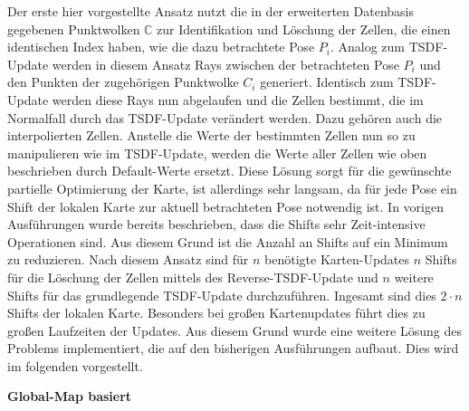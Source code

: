 Der erste hier vorgestellte Ansatz nutzt die in der erweiterten Datenbasis gegebenen Punktwolken $\mathbb{C}$ zur Identifikation und Löschung der Zellen, die einen identischen Index haben, wie die dazu betrachtete Pose $P_i$. Analog zum TSDF-Update werden in diesem Ansatz Rays zwischen der betrachteten Pose $P_i$ und den Punkten der zugehörigen Punktwolke $C_i$ generiert. Identisch zum TSDF-Update werden diese Rays nun abgelaufen und die Zellen bestimmt, die im Normalfall durch das TSDF-Update verändert werden. Dazu gehören auch die interpolierten Zellen. Anstelle die Werte der bestimmten Zellen nun so zu manipulieren wie im TSDF-Update, werden die Werte aller Zellen wie oben beschrieben durch Default-Werte ersetzt. Diese Lösung sorgt für die gewünschte partielle Optimierung der Karte, ist allerdings sehr langsam, da für jede Pose ein Shift der lokalen Karte zur aktuell betrachteten Pose notwendig ist. In vorigen Ausführungen wurde bereits beschrieben, dass die Shifts sehr Zeit-intensive Operationen sind. Aus diesem Grund ist die Anzahl an Shifts auf ein Minimum zu reduzieren. Nach diesem Ansatz sind für $n$ benötigte Karten-Updates $n$ Shifts für die Löschung der Zellen mittels des Reverse-TSDF-Update und $n$ weitere Shifts für das grundlegende TSDF-Update durchzuführen. Ingesamt sind dies $2 \cdot n$ Shifts der lokalen Karte. Besonders bei großen Kartenupdates führt dies zu großen Laufzeiten der Updates. Aus diesem Grund wurde eine weitere Lösung des Problems implementiert, die auf den bisherigen Ausführungen aufbaut. Dies wird im folgenden vorgestellt.


\textbf{Global-Map basiert}

